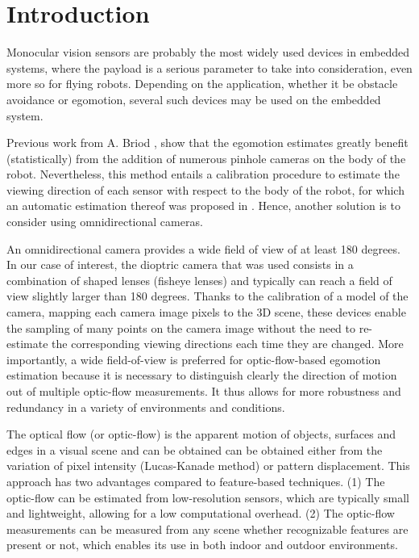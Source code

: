 \section{Introduction}
Monocular vision sensors are probably the most widely used devices in embedded systems, where the payload is a serious parameter to take into consideration, even more so for flying robots. Depending on the application, whether it be obstacle avoidance or egomotion, several such devices may be used on the embedded system. 

Previous work from A. Briod \cite{ekf}, show that the egomotion estimates greatly benefit (statistically) from the addition of numerous pinhole cameras on the body of the robot. Nevertheless, this method entails a calibration procedure to estimate the viewing direction of each sensor with respect to the body of the robot, for which an automatic estimation thereof was proposed in \cite{autocalib}. Hence, another solution is to consider using omnidirectional cameras. 

An omnidirectional camera provides a wide field of view of at least 180 degrees. In our case of interest, the dioptric camera that was used consists in a combination of shaped lenses (fisheye lenses) and typically can reach a field of view slightly larger than 180 degrees. Thanks to the calibration of a model of the camera, mapping each camera image pixels to the 3D scene, these devices enable the sampling of many points on the camera image without the need to re-estimate the corresponding viewing directions each time they are changed. More importantly, a wide field-of-view is preferred for optic-flow-based egomotion estimation because it is necessary to distinguish clearly the direction of motion out of multiple optic-flow measurements. It thus allows for more robustness and redundancy in a variety of environments and conditions. 

The optical flow (or optic-flow) is the apparent motion of objects, surfaces and edges in a visual scene and can be obtained can be obtained either from the variation of pixel intensity (Lucas-Kanade method) or pattern displacement. This approach has two advantages compared to feature-based techniques. (1) The optic-flow can be estimated from low-resolution sensors, which are typically small and lightweight, allowing for a low computational overhead. (2) The optic-flow measurements can be measured from any scene whether recognizable features are present or not, which enables its use in both indoor and outdoor environments.

